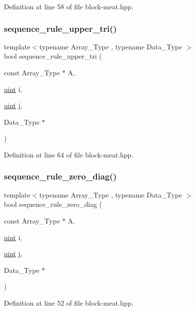 Definition at line 58 of file block-\/meat.\+hpp.

\mbox{\label{block-meat_8hpp_af5065fcabecdb2c3eedc5f95389aadfc}} 
\subsubsection{\texorpdfstring{sequence\+\_\+rule\+\_\+upper\+\_\+tri()}{sequence\_rule\_upper\_tri()}}
{\footnotesize\ttfamily template$<$typename Array\+\_\+\+Type , typename Data\+\_\+\+Type $>$ \\
bool sequence\+\_\+rule\+\_\+upper\+\_\+tri (\begin{DoxyParamCaption}\item[{const Array\+\_\+\+Type $\ast$}]{A,  }\item[{\hyperlink{typedefs_8hpp_a91ad9478d81a7aaf2593e8d9c3d06a14}{uint}}]{i,  }\item[{\hyperlink{typedefs_8hpp_a91ad9478d81a7aaf2593e8d9c3d06a14}{uint}}]{j,  }\item[{Data\+\_\+\+Type $\ast$}]{ }\end{DoxyParamCaption})\hspace{0.3cm}{\ttfamily [inline]}}



Definition at line 64 of file block-\/meat.\+hpp.

\mbox{\label{block-meat_8hpp_a0d46af0e4cb648e744267bc926870c56}} 
\subsubsection{\texorpdfstring{sequence\+\_\+rule\+\_\+zero\+\_\+diag()}{sequence\_rule\_zero\_diag()}}
{\footnotesize\ttfamily template$<$typename Array\+\_\+\+Type , typename Data\+\_\+\+Type $>$ \\
bool sequence\+\_\+rule\+\_\+zero\+\_\+diag (\begin{DoxyParamCaption}\item[{const Array\+\_\+\+Type $\ast$}]{A,  }\item[{\hyperlink{typedefs_8hpp_a91ad9478d81a7aaf2593e8d9c3d06a14}{uint}}]{i,  }\item[{\hyperlink{typedefs_8hpp_a91ad9478d81a7aaf2593e8d9c3d06a14}{uint}}]{j,  }\item[{Data\+\_\+\+Type $\ast$}]{ }\end{DoxyParamCaption})\hspace{0.3cm}{\ttfamily [inline]}}



Definition at line 52 of file block-\/meat.\+hpp.

